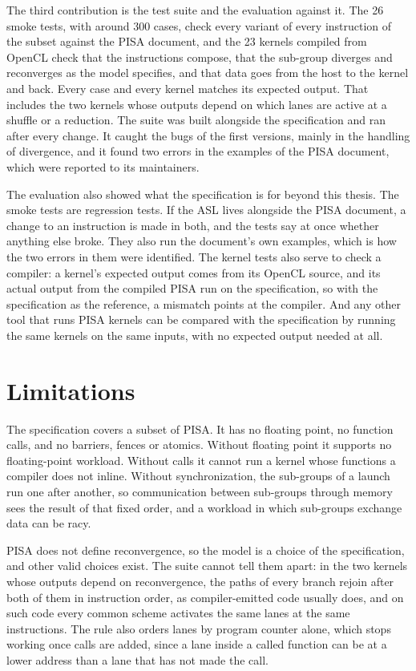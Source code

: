 The third contribution is the test suite and the evaluation against it.
The 26 smoke tests, with around 300 cases, check every variant of every
instruction of the subset against the PISA document, and the 23 kernels
compiled from OpenCL check that the instructions compose, that the
sub-group diverges and reconverges as the model specifies, and that
data goes from the host to the kernel and back. Every case and every
kernel matches its expected output. That includes the two kernels
whose outputs depend on which lanes are active at a shuffle or a
reduction. The suite was built alongside the specification and ran
after every change. It caught the bugs of the first versions, mainly in
the handling of divergence, and it found two errors in the examples of
the PISA document, which were reported to its maintainers.

The evaluation also showed what the specification is for beyond this
thesis. The smoke tests are regression tests. If the ASL lives alongside the
PISA document, a change to an instruction is made in both, and the
tests say at once whether anything else broke. They also run the
document's own examples, which is how the two errors in them were identified.
The kernel tests also serve to check a compiler: a kernel's expected
output comes from its OpenCL source, and its actual output from the
compiled PISA run on the specification, so with the specification as
the reference, a mismatch points at the compiler. And any other tool that runs PISA kernels can be compared
with the specification by running the same kernels on the same inputs,
with no expected output needed at all.

\section{Limitations}

The specification covers a subset of PISA. It has no floating point,
no function calls, and no barriers, fences or atomics. Without floating
point it supports no floating-point workload. Without calls it cannot
run a kernel whose functions a compiler does not inline. Without
synchronization, the sub-groups of a launch run one after another, so
communication between sub-groups through memory sees the result of
that fixed order, and a workload in which sub-groups exchange data can
be racy.

PISA does not define reconvergence, so the model is a choice of the
specification, and other valid choices exist. The suite cannot tell
them apart: in the two kernels whose outputs depend on reconvergence,
the paths of every branch rejoin after both of them in instruction
order, as compiler-emitted code usually does, and on such code every common
scheme activates the same lanes at the same instructions. The rule also
orders lanes by program counter alone, which stops working once calls
are added, since a lane inside a called function can be at a lower
address than a lane that has not made the call.

